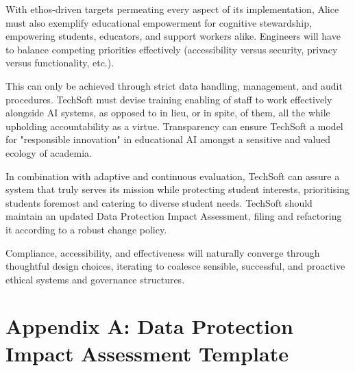 \documentclass[14pt,a4paper]{article}
\begin{document}
With ethos-driven targets permeating every aspect of its implementation, Alice must also exemplify educational empowerment for cognitive stewardship, empowering students, educators, and support workers alike. Engineers will have to balance competing priorities effectively (accessibility versus security, privacy versus functionality, etc.).

This can only be achieved through strict data handling, management, and audit procedures. TechSoft must devise training enabling of staff to work effectively alongside AI systems, as opposed to in lieu, or in spite, of them, all the while upholding accountability as a virtue.
Transparency can ensure TechSoft a model for "responsible innovation" in educational AI amongst a sensitive and valued ecology of academia.

In combination with adaptive and continuous evaluation, TechSoft can assure a system that truly serves its mission while protecting student interests, prioritising students foremost and catering to diverse student needs.
TechSoft should maintain an updated Data Protection Impact Assessment, filing and refactoring it according to a robust change policy.

Compliance, accessibility, and effectiveness will naturally converge through thoughtful design choices, iterating to coalesce sensible, successful, and proactive ethical systems and governance structures.



\newpage
\appendix
\section{Appendix A: Data Protection Impact Assessment Template}\label{appendix:a}
\end{document}
